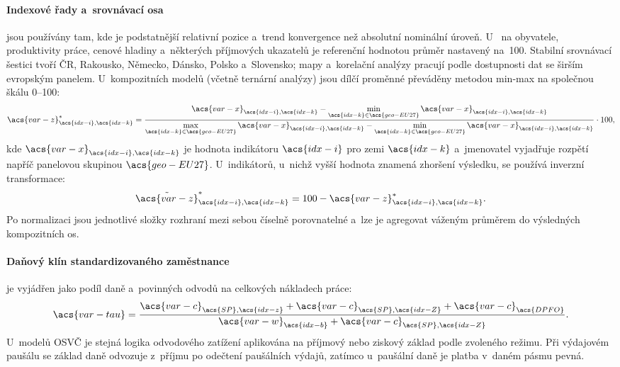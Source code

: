 \paragraph{Indexové řady a~srovnávací osa}\label{par:normalizace} jsou používány tam, kde je podstatnější relativní pozice a~trend konvergence než
absolutní nominální úroveň. U~ na obyvatele, produktivity práce,
cenové hladiny a~některých příjmových ukazatelů je referenční hodnotou průměr
 nastavený na~100. Stabilní srovnávací šestici tvoří \ac{ČR}, Rakousko, Německo, Dánsko,
Polsko a~Slovensko; mapy a~korelační analýzy pracují podle dostupnosti dat se
širším evropským panelem. U~kompozitních modelů (včetně ternární analýzy)
jsou dílčí proměnné převáděny metodou min-max na společnou škálu \SIrange{0}{100}{}:
\begin{equation}
  \acs{var-z}^{\ast}_{\acs{idx-i},\acs{idx-k}}
    = \frac{\acs{var-x}_{\acs{idx-i},\acs{idx-k}} - \min\limits_{\acs{idx-k}\in\acs{geo-EU27}} \acs{var-x}_{\acs{idx-i},\acs{idx-k}}}
           {\max\limits_{\acs{idx-k}\in\acs{geo-EU27}} \acs{var-x}_{\acs{idx-i},\acs{idx-k}} - \min\limits_{\acs{idx-k}\in\acs{geo-EU27}} \acs{var-x}_{\acs{idx-i},\acs{idx-k}}}
      \cdot 100,
  \label{eq:minmax_general}
\end{equation}
kde \(\acs{var-x}_{\acs{idx-i},\acs{idx-k}}\) je hodnota indikátoru \(\acs{idx-i}\) pro zemi \(\acs{idx-k}\) a~jmenovatel
vyjadřuje rozpětí napříč panelovou skupinou \(\acs{geo-EU27}\). U~indikátorů,
u~nichž vyšší hodnota znamená zhoršení výsledku, se používá inverzní transformace:
\begin{equation}
  \tilde{\acs{var-z}}^{\ast}_{\acs{idx-i},\acs{idx-k}} = 100 - \acs{var-z}^{\ast}_{\acs{idx-i},\acs{idx-k}}.
  \label{eq:minmax_inverse_general}
\end{equation}
Po normalizaci jsou jednotlivé složky rozhraní mezi sebou číselně porovnatelné a~lze je agregovat
váženým průměrem do výsledných kompozitních os.\par

\paragraph{Daňový klín standardizovaného zaměstnance}\label{par:tax_distribution} je vyjádřen jako podíl daně a~povinných
odvodů na celkových nákladech práce:
\begin{equation}
  \acs{var-tau}
    = \frac{\acs{var-c}_{\acs{SP},\acs{idx-z}}
            + \acs{var-c}_{\acs{SP},\acs{idx-Z}}
            + \acs{var-c}_{\acs{DPFO}}}
           {\acs{var-w}_{\acs{idx-b}} + \acs{var-c}_{\acs{SP},\acs{idx-Z}}}.
  \label{eq:tax_wedge}
\end{equation}
U~modelů \acs{OSVČ} je stejná logika odvodového zatížení aplikována na příjmový nebo ziskový základ
podle zvoleného režimu. Při výdajovém paušálu se základ daně odvozuje z~příjmu
po odečtení paušálních výdajů, zatímco u~paušální daně je platba v~daném pásmu
pevná.\par

